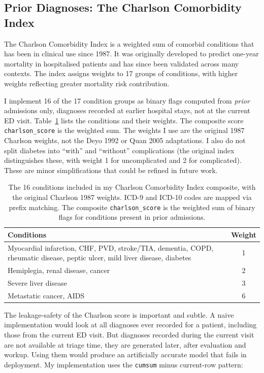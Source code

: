 \subsection*{Prior Diagnoses: The Charlson Comorbidity Index}

The Charlson Comorbidity Index \citep{charlson1987method} is a weighted sum of comorbid conditions that has been in clinical use since 1987. It was originally developed to predict one-year mortality in hospitalised patients and has since been validated across many contexts. The index assigns weights to 17 groups of conditions, with higher weights reflecting greater mortality risk contribution.

I implement 16 of the 17 condition groups as binary flags computed from \emph{prior} admissions only, diagnoses recorded at earlier hospital stays, not at the current ED visit. Table~\ref{tab:charlson} lists the conditions and their weights. The composite score \texttt{charlson\_score} is the weighted sum. The weights I use are the original 1987 Charlson weights, not the Deyo 1992 or Quan 2005 adaptations. I also do not split diabetes into ``with'' and ``without'' complications (the original index distinguishes these, with weight 1 for uncomplicated and 2 for complicated). These are minor simplifications that could be refined in future work.

\begin{table}[htbp]
 \centering
 \caption[Charlson comorbidity conditions and weights]{The 16 conditions included in my Charlson Comorbidity Index composite, with the original Charlson 1987 weights. ICD-9 and ICD-10 codes are mapped via prefix matching. The composite \texttt{charlson\_score} is the weighted sum of binary flags for conditions present in prior admissions.}
 \label{tab:charlson}
 \small
 \begin{tabular}{lc}
 \toprule
 Conditions & Weight \\
 \midrule
 Myocardial infarction, CHF, PVD, stroke/TIA, dementia, COPD, rheumatic disease, peptic ulcer, mild liver disease, diabetes & 1 \\
 Hemiplegia, renal disease, cancer & 2 \\
 Severe liver disease & 3 \\
 Metastatic cancer, AIDS & 6 \\
 \bottomrule
 \end{tabular}
\end{table}

The leakage-safety of the Charlson score is important and subtle. A naive implementation would look at all diagnoses ever recorded for a patient, including those from the current ED visit. But diagnoses recorded during the current visit are not available at triage time, they are generated later, after evaluation and workup. Using them would produce an artificially accurate model that fails in deployment. My implementation uses the \texttt{cumsum} minus current-row pattern:

